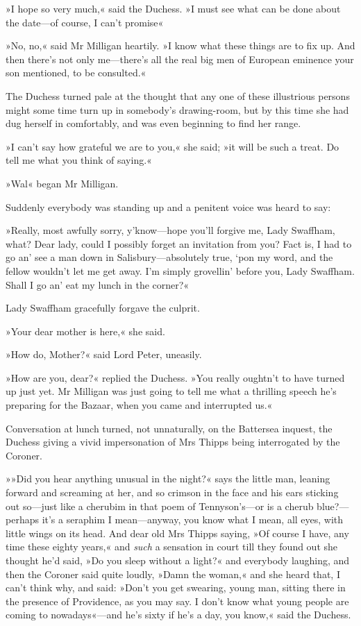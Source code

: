 »I hope so very much,« said the Duchess. »I must see what can be done about the date—of course, I can't promise\longdash«

»No, no,« said Mr Milligan heartily. »I know what these things are to fix up. And then there's not only me—there's all the real big men of European eminence your son mentioned, to be consulted.«

The Duchess turned pale at the thought that any one of these illustrious persons might some time turn up in somebody's drawing-room, but by this time she had dug herself in comfortably, and was even beginning to find her range.

»I can't say how grateful we are to you,« she said; »it will be such a treat. Do tell me what you think of saying.«

»Wal\longdash« began Mr Milligan.

Suddenly everybody was standing up and a penitent voice was heard to say:

»Really, most awfully sorry, y'know—hope you'll forgive me, Lady Swaffham, what? Dear lady, could I possibly forget an invitation from you? Fact is, I had to go an' see a man down in Salisbury—absolutely true, `pon my word, and the fellow wouldn't let me get away. I'm simply grovellin' before you, Lady Swaffham. Shall I go an' eat my lunch in the corner?«

Lady Swaffham gracefully forgave the culprit.

»Your dear mother is here,« she said.

»How do, Mother?« said Lord Peter, uneasily.

»How are you, dear?« replied the Duchess. »You really oughtn't to have turned up just yet. Mr Milligan was just going to tell me what a thrilling speech he's preparing for the Bazaar, when you came and interrupted us.«

Conversation at lunch turned, not unnaturally, on the Battersea inquest, the Duchess giving a vivid impersonation of Mrs Thipps being interrogated by the Coroner.

»»Did you hear anything unusual in the night?« says the little man, leaning forward and screaming at her, and so crimson in the face and his ears sticking out so—just like a cherubim in that poem of Tennyson's—or is a cherub blue?---perhaps it's a seraphim I mean—anyway, you know what I mean, all eyes, with little wings on its head. And dear old Mrs Thipps saying, »Of course I have, any time these eighty years,« and \textit{such} a sensation in court till they found out she thought he'd said, »Do you sleep without a light?« and everybody laughing, and then the Coroner said quite loudly, »Damn the woman,« and she heard that, I can't think why, and said: »Don't you get swearing, young man, sitting there in the presence of Providence, as you may say. I don't know what young people are coming to nowadays«---and he's sixty if he's a day, you know,« said the Duchess.

